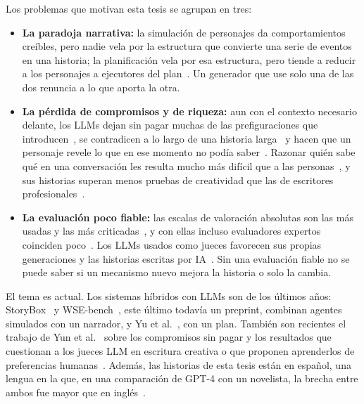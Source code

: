 \begin{introduction}
Los problemas que motivan esta tesis se agrupan en tres:

\begin{itemize}
  \item \textbf{La paradoja narrativa:} la simulación de personajes da comportamientos creíbles,
  pero nadie vela por la estructura que convierte una serie de eventos en una historia; la
  planificación vela por esa estructura, pero tiende a reducir a los personajes a ejecutores del
  plan~\cite{louchart2003,riedl2010}. Un generador que use solo una de las dos renuncia a lo que
  aporta la otra.
  \item \textbf{La pérdida de compromisos y de riqueza:} aun con el contexto necesario delante, los
  LLMs dejan sin pagar muchas de las prefiguraciones que introducen~\cite{yun2026}, se contradicen a
  lo largo de una historia larga~\cite{li2026} y hacen que un personaje revele lo que en ese momento
  no podía saber~\cite{ahn2024}. Razonar quién sabe qué en una conversación les resulta mucho más
  difícil que a las personas~\cite{kim2023}, y sus historias superan menos pruebas de creatividad
  que las de escritores profesionales~\cite{chakrabarty2024}.
  \item \textbf{La evaluación poco fiable:} las escalas de valoración absolutas son las más usadas y
  las más criticadas~\cite{amidei2019}, y con ellas incluso evaluadores expertos coinciden
  poco~\cite{chiang2023}. Los LLMs usados como jueces favorecen sus propias generaciones y las
  historias escritas por IA~\cite{zheng2023,panickssery2024,tutone2026}. Sin una evaluación fiable
  no se puede saber si un mecanismo nuevo mejora la historia o solo la cambia.
\end{itemize}

El tema es actual. Los sistemas híbridos con LLMs son de los últimos años: StoryBox~\cite{chen2026a}
y WSE-bench~\cite{chen2026b}, este último todavía un preprint, combinan agentes simulados con un
narrador, y Yu et al.~\cite{yu2025}, con un plan. También son recientes el trabajo de Yun et al.~\cite{yun2026} sobre los
compromisos sin pagar y los resultados que cuestionan a los jueces LLM en escritura creativa o que
proponen aprenderlos de preferencias humanas~\cite{tutone2026,fein2026}. Además, las historias de
esta tesis están en español, una lengua en la que, en una comparación de GPT-4 con un novelista, la
brecha entre ambos fue mayor que en inglés~\cite{marco2024}.


\end{introduction}
